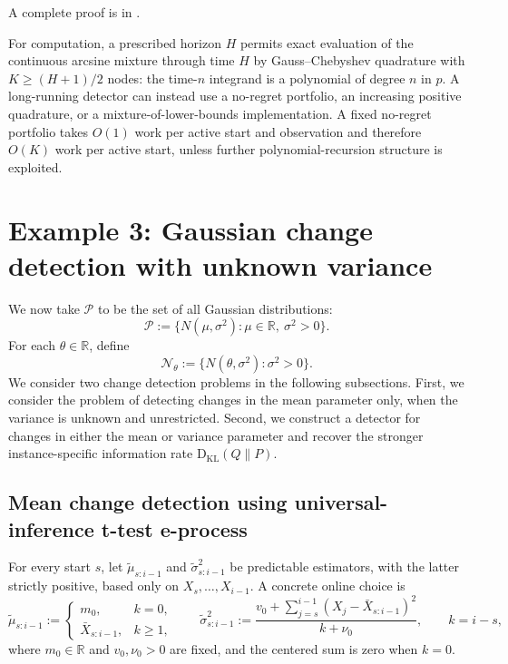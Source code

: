 \documentclass[12pt]{article}
\theoremstyle{spaced}
\theoremstyle{remark}
\newcommand{\KL}{\mathrm{D}_{\text{KL}}}
\begin{document}
A complete proof is in
.  %

For computation, a prescribed horizon $H$ permits exact evaluation of the
continuous arcsine mixture through time $H$ by Gauss--Chebyshev quadrature
with $K\ge(H+1)/2$ nodes: the time-$n$ integrand is a polynomial of degree
$n$ in $p$.  A long-running detector can instead use a no-regret portfolio,
an increasing positive quadrature, or a mixture-of-lower-bounds
implementation.  
A fixed no-regret portfolio takes $O(1)$ work per active start and observation and therefore $O(K)$ work per active start, unless further polynomial-recursion structure is exploited.

\section{Example 3: Gaussian change detection with unknown variance}
\label{sec:gaussian-unknown-variance}

We now take $\mathcal P$ to be the set of all Gaussian distributions:
\[
  \mathcal P
  :=\{N(\mu,\sigma^2):\mu\in\mathbb R,\ \sigma^2>0\}.  
\]
For each $\theta\in\mathbb R $,
define
\[\mathcal N_\theta
  :=\{N(\theta,\sigma^2):\sigma^2>0\}.\]
We consider two change detection problems in the following subsections. First, we consider the problem of detecting changes in the mean parameter only, when the variance is unknown and unrestricted.  Second, we
construct a detector for changes in either the mean or variance parameter and  recover the stronger
instance-specific information rate $\KL(Q\|P)$.

\subsection{Mean change detection using universal-inference t-test e-process}

For every start $s$, let $\widetilde\mu_{s:i-1}$ and
$\widetilde\sigma^2_{s:i-1}$ be predictable estimators, with the latter
strictly positive, based only on $X_s,\ldots,X_{i-1}$.  A concrete online
choice is
\begin{equation}
\label{eq:gaussian-regularized-predictors}
  \widetilde\mu_{s:i-1}
  :=
  \begin{cases}
    m_0,&k=0,\\
    \bar X_{s:i-1},&k\ge1,
  \end{cases}
  \qquad
  \widetilde\sigma^2_{s:i-1}
  :=
  \frac{v_0+\sum_{j=s}^{i-1}
        (X_j-\bar X_{s:i-1})^2}{k+\nu_0},
  \qquad k=i-s,
\end{equation}
where $m_0\in\mathbb R$ and $v_0,\nu_0>0$ are fixed, and the centered sum is
zero when $k=0$.  
\end{document}
